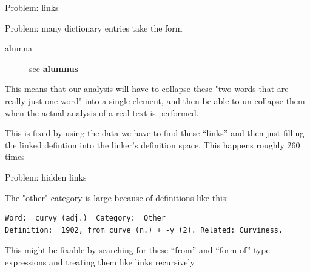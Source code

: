 \documentclass[10pt]{beamer}
\begin{document}
\begin{frame}[fragile]{Problem: links}

  Problem: many dictionary entries take the form

\begin{description}
\item[alumna] see \textbf{alumnus}
\end{description}

This means that our analysis will have to collapse these "two words that are really just one word" into a single element, and then be able to un-collapse them when the actual analysis of a real text is performed.

\pause

This is fixed by using the data we have to find these ``links'' and then just filling the linked defintion into the linker's definition space. This happens roughly 260 times

\end{frame}

\begin{frame}[fragile]{Problem: hidden links}

The "other" category is large because of definitions like this:
\pause
\begin{verbatim}
Word:  curvy (adj.)  Category:  Other
Definition:  1902, from curve (n.) + -y (2). Related: Curviness.

\end{verbatim}
\pause
This might be fixable by searching for these ``from'' and ``form of'' type expressions and treating them like links recursively

\end{frame}















\end{document}
